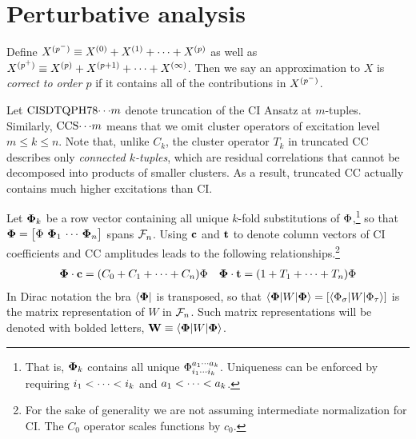 \documentclass[11pt]{article}
\numberwithin{equation}{section}
\begin{document}
\setlength{\abovedisplayskip}{3pt}
\setlength{\belowdisplayskip}{3pt}



\setcounter{section}{6}
\section{Perturbative analysis}


\begin{dfn}
Define $X^{(p^-)}\equiv X^{(0)}+X^{(1)}+\cdots+X^{(p)}$
as well as
$
  X^{(p^+)}
\equiv
  X^{(p)}
+
  X^{(p+1)}
+
  \cdots
+
  X^{(\infty)}
$.
Then we say an approximation to $X$ is \textit{correct to order $p$} if it contains all of the contributions in $X^{(p^-)}$.
\end{dfn}

\begin{dfn}
Let $\mathrm{CISDTQPH78}{\cdots}m$ denote truncation of the CI Ansatz at $m$-tuples.
Similarly, $\mathrm{CCS}{\cdots}m$ means that we omit cluster operators of excitation level $m\leq k\leq n$.
Note that, unlike $C_k$, the cluster operator $T_k$ in truncated CC describes only \textit{connected $k$-tuples}, which are residual correlations that cannot be decomposed into products of smaller clusters.
As a result, truncated CC actually contains much higher excitations than CI.
\end{dfn}

\begin{ntt}
Let
$\bm{\F}_k$
be a row vector containing all unique $k$-fold substitutions of $\Phi $,\footnote{That is, $\bm{\F}_k$ contains all unique $\Phi _{i_1\cdots i_k}^{a_1\cdots a_k}$.
Uniqueness can be enforced by requiring $i_1<\cdots<i_k$ and $a_1<\cdots<a_k$.}
so that $\bm{\F}=\pma{\F\ \bm{\F}_1\,\cd\,\bm{\F}_n}$ spans $\mathcal{F}_n$.
Using $\mathbf{c}$ and $\mathbf{t}$ to denote column vectors of CI coefficients and CC amplitudes leads to the following relationships.\footnote{For the sake of generality we are not assuming intermediate normalization for CI.  The $C_0$ operator scales functions by $c_0$.}
\begin{align}
  \mathbf{\Phi }\cdot\mathbf{c}
=
  (C_0 + C_1+\cdots +C_n)\Phi 
&&
  \mathbf{\Phi }\cdot\mathbf{t}
=
  (1 + T_1+\cdots +T_n)\Phi 
\end{align}
In Dirac notation the bra $\langle\mathbf{\Phi }|$ is transposed, so that
$
  \ip{\bm{\F}|W|\bm{\F}}
=
  [\ip{\F_\si|W|\F_\ta}]
$
is the matrix representation of $W$ in $\mathcal{F}_n$.
Such matrix representations will be denoted with bolded letters,
$
  \bo{W}
\equiv
  \ip{\bm{\F}|W|\bm{\F}}
$.
\end{ntt}
\end{document}
